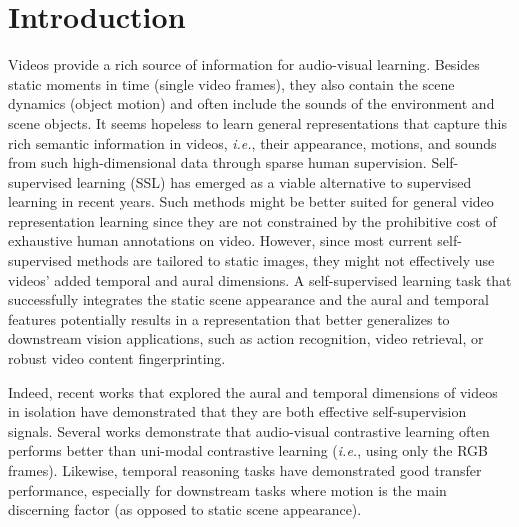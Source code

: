 \documentclass[letterpaper]{article} %
\newcommand{\ie}{\emph{i.e.}}
\begin{document}
\section{Introduction}


Videos provide a rich source of information for audio-visual learning.
Besides static moments in time (single video frames), they also contain the scene dynamics (object motion) and often include the sounds of the environment and scene objects.
It seems hopeless to learn general representations that capture this rich semantic information in videos, \ie, their appearance, motions, and sounds from such high-dimensional data through sparse human supervision. 
Self-supervised learning (SSL) \cite{Carl2015,chen2020simple,he2020momentum} has emerged as a viable alternative to supervised learning in recent years.
Such methods might be better suited for general video representation learning since they are not constrained by the prohibitive cost of exhaustive human annotations on video. 
However, since most current self-supervised methods are tailored to static images, they might not effectively use videos' added temporal and aural dimensions. 
A self-supervised learning task that successfully integrates the static scene appearance and the aural and temporal features potentially results in a representation that better generalizes to downstream vision applications, such as action recognition, video retrieval, or robust video content fingerprinting.


Indeed, recent works that explored the aural and temporal dimensions of videos in isolation have demonstrated that they are both effective self-supervision signals. 
Several works \cite{Morgado_2021_CVPR,patrick2020multi,alwassel2019self} demonstrate that audio-visual contrastive learning often performs better than uni-modal contrastive learning (\ie, using only the RGB frames). 
Likewise, temporal reasoning tasks \cite{misra2016shuffle,jenni2021time,dave2021tclr} have demonstrated good transfer performance, especially for downstream tasks where motion is the main discerning factor (as opposed to static scene appearance).
\end{document}
